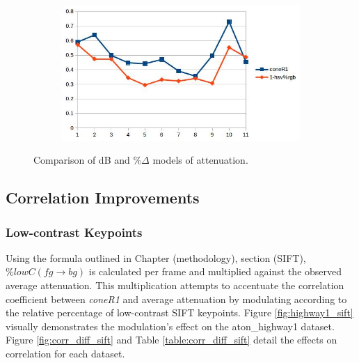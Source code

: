 \documentclass[12pt]{report}
\begin{document}
\begin{figure}
\begin{subfigure}{.49\linewidth}
  \caption{}
\end{subfigure}
\begin{subfigure}{.49\linewidth}
  \includegraphics[width=1\linewidth]{figures/correlations/rgb/pets2_hsv.jpg}
  \caption{}
\end{subfigure}

\caption{Comparison of dB and \%$\Delta$ models of attenuation. }
\label{fig:corr_compare}
\end{figure}

\subsection{Correlation Improvements}
\subsubsection{Low-contrast Keypoints}

Using the formula outlined in Chapter (methodology), section (SIFT), $\%lowC(fg \rightarrow bg)$ is calculated per frame and multiplied against the observed average attenuation. This multiplication attempts to accentuate the correlation coefficient between \textit{coneR1} and average attenuation by modulating according to the relative percentage of low-contrast SIFT keypoints. Figure \ref{fig:highway1_sift} visually demonstrates the modulation's effect on the aton\_highway1 dataset. Figure \ref{fig:corr_diff_sift} and Table \ref{table:corr_diff_sift} detail the effects on correlation for each dataset.
\end{document}
